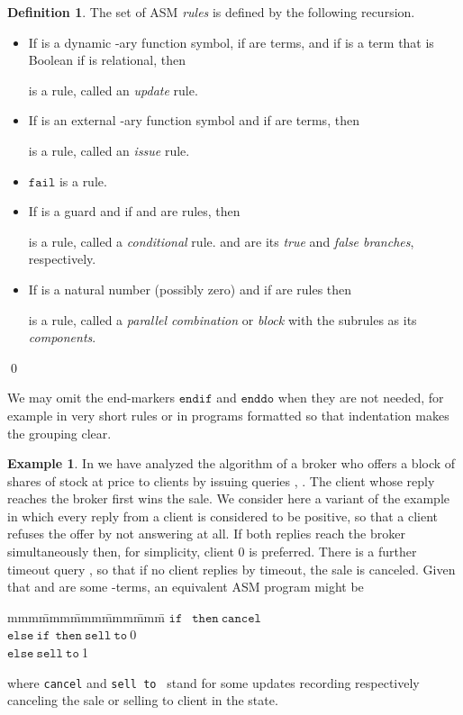 \documentclass{LMCS}
\theoremstyle{definition}
\newtheorem{df}[thm]{Definition}
\newtheorem{ex}[thm]{Example}
\newenvironment{eatab}
 {\bigskip\noindent\begin{minipage}{\textwidth}\upshape\ttfamily
  \begin{tabbing}mmm\=mmm\=mmm\=mmm\=mmm\=\kill}
 {\end{tabbing}\end{minipage}\bigskip}
\newenvironment{ls}{\begin{itemize}}{\end{itemize}}
\newcommand{\ttt}[1]{\ensuremath{\mathtt {#1}}}
\begin{document}
\begin{df}
The set of ASM \emph{rules} is defined by the following recursion.
\begin{ls}
\item If  is a dynamic -ary function symbol, if
   are terms, and if  is a term that is Boolean if
   is relational, then

is a rule, called an \emph{update} rule.
\item If  is an external -ary function symbol and if
   are terms, then

is a rule, called an \emph{issue} rule.
\item \ttt{fail} is a rule.
\item If  is a guard and if  and  are rules, then

is a rule, called a \emph{conditional} rule.   and  are its
\emph{true} and \emph{false branches}, respectively.
\item If  is a natural number (possibly zero) and if
   are rules then

is a rule, called a \emph{parallel combination} or \emph{block} with
the subrules  as its \emph{components}.
\end{ls}
\qed\end{df}

We may omit the end-markers \ttt{endif} and \ttt{enddo} when they are
not needed, for example in very short rules or in programs formatted
so that indentation makes the grouping clear.

\begin{ex} \label{ex:broker} In \cite{ga1} we have analyzed the
algorithm of a broker who offers a block of  shares of stock 
at price  to clients  by issuing queries ,
. The client whose reply reaches the broker first wins the
sale. We consider here a variant of the example in which every reply
from a client is considered to be positive, so that a client refuses
the offer by not answering at all. If both replies reach the broker
simultaneously then, for simplicity, client 0 is preferred. There is
a further timeout query , so that if no client replies by
timeout, the sale is canceled. Given that 
and  are some -terms, an equivalent ASM program
might be

\begin{eatab}
  \>\>\ttt{if\ }
  \ttt{\ then\ cancel}\\
  \>\>\ttt{else\ if\ }\ttt{\ then\ sell\ to\ }0\\
  \>\>\ttt{else\ sell\ to\ }1
\end{eatab}

\noindent where \texttt{cancel} and \texttt{sell to } stand for
some updates recording respectively canceling the sale or selling to
client  in the state.
\end{ex}
\end{document}
